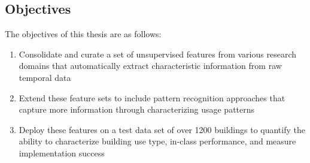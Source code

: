 \subsection{Objectives}
The objectives of this thesis are as follows:
\begin{enumerate}
\item Consolidate and curate a set of unsupervised features from various research domains that automatically extract characteristic information from raw temporal data
\item Extend these feature sets to include pattern recognition approaches that capture more information through characterizing usage patterns
\item Deploy these features on a test data set of over 1200 buildings to quantify the ability to characterize building use type, in-class performance, and measure implementation success
\end{enumerate}